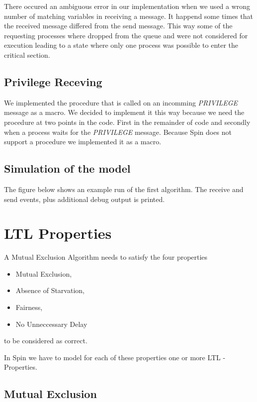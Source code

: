 \documentclass{llncs}
\begin{document}
There occured an ambiguous error in our implementation when we used a wrong number of matching
variables in receiving a message. It happend some times that the received message differed from the
send message. This way some of the requesting processes where dropped from the queue and were not considered
for execution leading to a state where only one process was possible to enter the critical section.

\subsection{Privilege Receving}

We implemented the procedure that is called on an incomming \emph{PRIVILEGE} message as a macro.
We decided to implement it this way because we need the procedure at two points in the code.
First in the remainder of code and secondly when a process waits for the \emph{PRIVILEGE} message.
Because Spin does not support a procedure we implemented it as a macro.

\subsection{Simulation of the model\label{ssec:run}}
The figure below shows an example run of the first algorithm. The receive and send events, plus
additional debug output is printed.



\section{LTL Properties}

A Mutual Exclusion Algorithm needs to satisfy the four properties
\begin{itemize}
    \item Mutual Exclusion,
    \item Absence of Starvation,
    \item Fairness,
    \item No Unneccessary Delay
\end{itemize}
to be considered as correct.

In Spin we have to model for each of these properties one or more
LTL - Properties.

\subsection{Mutual Exclusion}
\end{document}
